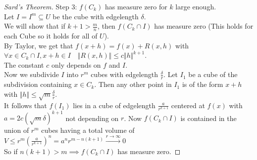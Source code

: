 \begin{proof}[Sard's Theorem]
    Step 3: $f(C_k)$ has measure zero for $k$ large enough.\\
    Let $I=I^m\subseteq U$ be the cube with edgelength $\delta$.\\
    We will show that if $k+1>\frac{m}{n}$, then $f(C_k\cap I)$ has measure zero (This holds for each Cube so it holds for all of $U$).\\
    By Taylor, we get that $f(x+h)=f(x)+R(x,h)$ with $\forall x\in C_k\cap I,x+h\in I\quad \Vert R(x,h)\Vert\leq c\Vert h\Vert ^{k+1}$.\\
    The constant $c$ only depends on $f$ and $I$.\\
    Now we subdivide $I$ into $r^m$ cubes with edgelength $\frac{\delta}{r}$.
    Let $I_1$ be a cube of the subdivision containing $x\in C_k$. Then any other point in $I_1$ is of the form $x+h$ with $\Vert h\Vert\leq \sqrt{m}\frac{\delta}{r}$.\\
    It follows that $f(I_1)$ lies in a cube of edgelength $\frac{a}{r^{k+1}}$ centered at $f(x)$ with $a=2c(\sqrt{m}\delta)^{k+1}$ not depending on $r$.
    Now $f(C_k\cap I)$ is contained in the union of $r^m$ cubes having a total volume of $V\leq r^m (\frac{a}{r^{k+1}})^n=a^nr^{m-n(k+1)}\stackrel{r\to\infty}{\to} 0$\\
    So if $n(k+1)>m\implies f(C_k\cap I)$ has measure zero.
\end{proof}
